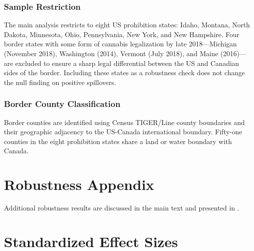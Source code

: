 \documentclass[12pt]{article}
\begin{document}
\subsubsection*{Sample Restriction} The main analysis restricts to eight US prohibition states: Idaho, Montana, North Dakota, Minnesota, Ohio, Pennsylvania, New York, and New Hampshire. Four border states with some form of cannabis legalization by late 2018---Michigan (November 2018), Washington (2014), Vermont (July 2018), and Maine (2016)---are excluded to ensure a sharp legal differential between the US and Canadian sides of the border. Including these states as a robustness check does not change the null finding on positive spillovers.

\subsubsection*{Border County Classification} Border counties are identified using Census TIGER/Line county boundaries and their geographic adjacency to the US-Canada international boundary. Fifty-one counties in the eight prohibition states share a land or water boundary with Canada.


\section{Robustness Appendix}

Additional robustness results are discussed in the main text and presented in .


\section{Standardized Effect Sizes}
\label{sec:sde}


\end{document}

